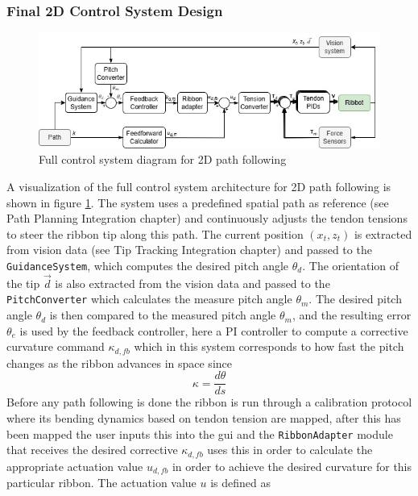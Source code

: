 \subsubsection{Final 2D Control System Design}

\begin{figure} [H]
    \centering
    \includegraphics[width=\linewidth]{images/RibbotControl_V2.png}
    \caption{Full control system diagram for 2D path following}
    \label{fig:2Dcontrol}
\end{figure}
A visualization of the full control system architecture for 2D path following is shown in figure \ref{fig:2Dcontrol}. The system uses a predefined spatial path as reference (see Path Planning Integration chapter) and continuously adjusts the tendon tensions to steer the ribbon tip along this path. The current position \((x_t, z_t)\) is extracted from vision data (see Tip Tracking Integration chapter) and passed to the \texttt{GuidanceSystem}, which computes the desired pitch angle \(\theta_d\). The orientation of the tip \(\vec{d}\) is also extracted from the vision data and passed to the \texttt{PitchConverter} which calculates the measure pitch angle \(\theta_m\). The desired pitch angle \(\theta_d\) is then compared to the measured pitch angle \(\theta_m\), and the resulting error \(\theta_e\) is used by the feedback controller, here a PI controller to compute a corrective curvature command \(\kappa_{d,fb}\) which in this system corresponds to how fast the pitch changes as the ribbon advances in space since 
\begin{equation}
    \kappa = \frac{d\theta}{ds}
\end{equation}
Before any path following is done the ribbon is run through a calibration protocol where its bending dynamics based on tendon tension are mapped, after this has been mapped the user inputs this into the gui and the \texttt{RibbonAdapter} module that receives the desired corrective \(\kappa_{d, fb}\) uses this in order to calculate the appropriate actuation value \(u_{d, fb}\) in order to achieve the desired curvature for this particular ribbon. The actuation value \(u\) is defined as 
